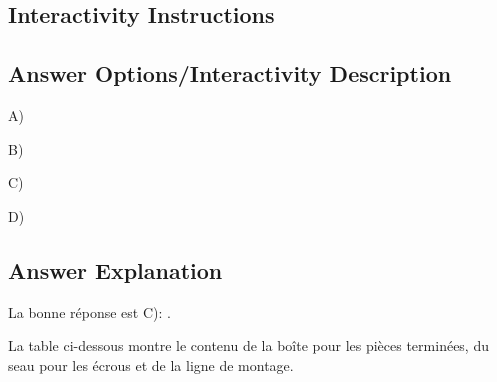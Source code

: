 \documentclass[a4paper,11pt]{report}
\newcommand{\taskGraphicsFolder}{..}
\begin{document}
\subsection*{Interactivity Instructions}



\begingroup
\renewcommand{\arraystretch}{1.5}
\subsection*{Answer Options/Interactivity Description}

A) \raisebox{-0.5ex}{}

B) \raisebox{-0.5ex}{}

C) \raisebox{-0.5ex}{}

D) \raisebox{-0.5ex}{}

\endgroup

\subsection*{Answer Explanation}

La bonne réponse est C): \raisebox{-0.5ex}{}.

La table ci-dessous montre le contenu de la boîte pour les pièces terminées, du seau pour les écrous et de la ligne de montage.
\end{document}
